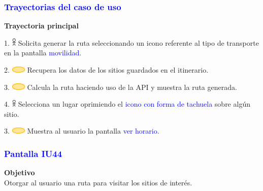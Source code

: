 \subsubsection{\textcolor{blue}{Trayectorias del caso de uso}}
\textbf{Trayectoria principal}
    
    1. \includegraphics[width=0.0150\textwidth]{Figuras/persona.png} Solicita generar la ruta seleccionando un icono referente al tipo de transporte en la pantalla \textcolor{blue}{movilidad}.
    
      2. \includegraphics[width=0.0500\textwidth]{Figuras/sistema.png} Recupera los datos de los sitios guardados en el itinerario.

    3. \includegraphics[width=0.0500\textwidth]{Figuras/sistema.png} Calcula la ruta haciendo uso de la API y muestra la ruta generada.

    4. \includegraphics[width=0.0150\textwidth]{Figuras/persona.png} Selecciona un lugar oprimiendo el \textcolor{blue}{icono con forma de tachuela} sobre algún sitio.

    3. \includegraphics[width=0.0500\textwidth]{Figuras/sistema.png} Muestra al usuario la pantalla \textcolor{blue}{ver horario}.
    
\subsubsection{\textcolor{blue}{Pantalla IU44}}

\textbf{Objetivo} \\
Otorgar al usuario una ruta para visitar los sitios de interés.

